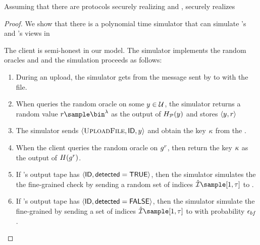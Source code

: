 
\begin{theorem}
Assuming that there are protocols securely realizing \distSigningFunc and \authOPRFFunc, \protocolEM securely realizes \contentModFunc \end{theorem}

\begin{proof}

We show that there is a polynomial time simulator that can simulate \client's and \server's views in \protocolEM

%
The client is semi-honest in our model. The simulator implements the random oracles \primeRO and \ro and the simulation proceeds as follows: 

\begin{enumerate}
\item During an upload, the simulator gets \genericFileID from the message sent by \client to \server with the file.  
\item When \client queries the random oracle \primeRO  on some $\genericCInputElmt \in \universe$, the simulator returns a random value $\genericRand \sample \bin^{\secParam}$ as the output of $\primeRO(\genericCInputElmt)$ and stores $\langle \genericCInputElmt, \genericRand \rangle$ 
\item  The simulator sends $\langle \uploadFile, \genericFileID, \genericCInputElmt \rangle$ and obtain the key
$\kappa$ from the \contentModFunc. 
\item When the client queries the random oracle \ro on $\qrGen^{\genericRand}$, then return the key $\kappa$ as the output of $\ro(\qrGen^{\genericRand})$. 
\item If \client's output tape has $\langle \mathsf{ID}, \mathsf{detected} = \mathsf{TRUE} \rangle$, then the simulator simulates the the fine-grained check by sending a random set of indices $\hat{\partitionIDSet} \sample [1, \numBlocklistParts]$ to \client. 
\item If \client's output tape has $\langle \mathsf{ID}, \mathsf{detected} = \mathsf{FALSE} \rangle$, then the simulator simulate the fine-grained by sending a set of indices $\hat{\partitionIDSet} \sample [1, \numBlocklistParts]$ to \client with probability $\epsilon_{bf}$. 
\end{enumerate}




\end{proof}
